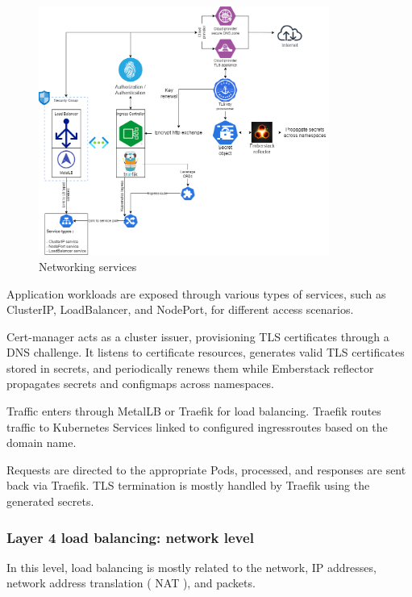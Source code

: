 \begin{figure}[H]\centering
\includegraphics[width=0.85\textwidth,angle=00]{assets/f22.png}
\caption{ Networking services}
\label{fig:Networking services}
\end{figure}

Application workloads are exposed through various types of services, such as ClusterIP, LoadBalancer, and NodePort, for different access scenarios.

Cert-manager acts as a cluster issuer, provisioning TLS certificates through a DNS challenge. It listens to certificate resources, generates valid TLS certificates stored in secrets, and periodically renews them while Emberstack reflector propagates secrets and configmaps across namespaces.

Traffic enters through MetalLB or Traefik for load balancing. Traefik routes traffic to Kubernetes Services linked to configured ingressroutes based on the domain name.

Requests are directed to the appropriate Pods, processed, and responses are sent back via Traefik. TLS termination is mostly handled by Traefik using the generated secrets.

\newpage

\subsubsection{Layer 4 load balancing: network level }

In this level, load balancing is mostly related to the network, IP addresses, network address translation ( NAT ), and packets. 

